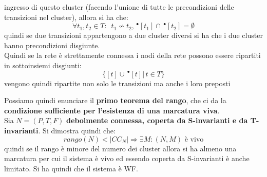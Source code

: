 \documentclass[a4paper,12pt, oneside]{book}
\begin{document}
ingresso di questo cluster (facendo l'unione di tutte le precondizioni delle
transizioni nel cluster), allora si ha che:
\[\forall t_1,t_2\in T:\,\,\,t_1\not\sim t_2, \,^\bullet [t_1]\cap \,^\bullet
  [t_2]  = \emptyset\]
quindi se due transizioni appartengono a due cluster diversi si ha che i due
cluster hanno precondizioni disgiunte.\\
Quindi se la rete è strettamente connessa i nodi della rete possono essere
ripartiti in sottoinsiemi disgiunti:
\[\{[t]\cup\,^\bullet [t]|\,t\in T\}\]
vengono quindi ripartite non solo le transizioni ma anche i loro preposti
\begin{teorema}
  Possiamo quindi enunciare il \textbf{primo teorema del rango}, che ci da la
  \textbf{condizione sufficiente per l'esistenza di una marcatura viva}.\\ 
  Sia $N = (P, T , F )$ \textbf{debolmente connessa, coperta da S-invarianti e
    da T-invarianti}. Si dimostra quindi che:
  \[rango(N)<|CC_N|\Rightarrow \exists M:(N,M) \mbox{ è vivo}\]
  quindi se il rango è minore del numero dei cluster allora si ha almeno una
  marcatura per cui il sistema è vivo ed essendo coperta da S-invarianti è
  anche limitato. Si ha quindi che il sistema è WF.
\end{teorema}
\end{document}
